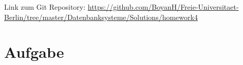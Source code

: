 \usepackage{graphicx}
\usepackage{fancyvrb}

\newcommand{\dozent}{Prof. Dr. Agn`es Voisard, Nicolas Lehmann}					%
\newcommand{\tutor}{Nicolas Lehmann}						%
\newcommand{\tutoriumNo}{10}				%
\newcommand{\projectNo}{4}									%
\newcommand{\veranstaltung}{Datenbanksysteme}	%
\newcommand{\semester}{SoSe 2017}						%
\newcommand{\studenten}{Boyan Hristov, Julian Habib}			%





Link zum Git Repository: \url{https://github.com/BoyanH/Freie-Universitaet-Berlin/tree/master/Datenbanksysteme/Solutions/homework4}

\section{Aufgabe}


